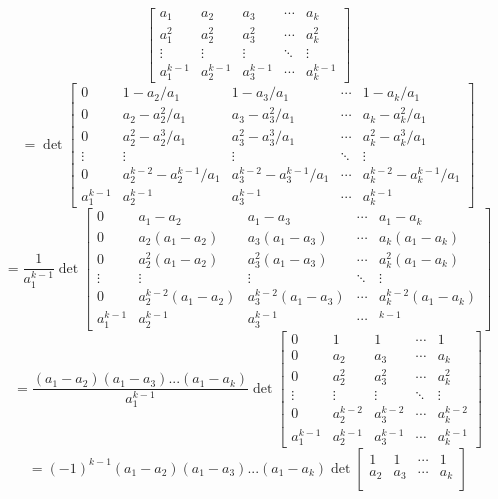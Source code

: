 \begin{itemize}
\begin{itemize}
$$\begin{bmatrix}
a_1 & a_2 & a_3 & \cdots & a_k \\
a_1^2 & a_2^2 & a_3^2 & \cdots & a_k^2 \\
\vdots & \vdots & \vdots & \ddots & \vdots \\
a_1^{k-1} & a_2^{k-1} & a_3^{k-1} & \cdots & a_k^{k-1}
\end{bmatrix}$$ 
$$= \det\begin{bmatrix}
0 & 1 - a_2/a_1 & 1 - a_3/a_1 & \cdots & 1 - a_k/a_1 \\
0 & a_2 - a_2^2/a_1 & a_3 - a_3^2/a_1 & \cdots & a_k - a_k^2/a_1 \\
0 & a_2^2 - a_2^3/a_1 & a_3^2 - a_3^3/a_1 & \cdots & a_k^2 - a_k^3/a_1 \\
\vdots & \vdots & \vdots & \ddots & \vdots \\
0 & a_2^{k-2} - a_2^{k-1}/a_1 & a_3^{k-2} - a_3^{k-1}/a_1 & \cdots & a_k^{k-2} - a_k^{k-1}/a_1 \\
a_1^{k-1} & a_2^{k-1} & a_3^{k-1} & \cdots & a_k^{k-1}
\end{bmatrix}$$
$$= \frac{1}{a_1^{k-1}}\det\begin{bmatrix}
0 & a_1 - a_2 & a_1 - a_3 & \cdots & a_1 - a_k \\
0 & a_2(a_1 - a_2) & a_3(a_1 - a_3) & \cdots & a_k(a_1 - a_k) \\
0 & a_2^2(a_1 - a_2) & a_3^2(a_1 - a_3) & \cdots & a_k^2(a_1 - a_k) \\
\vdots & \vdots & \vdots & \ddots & \vdots \\
0 & a_2^{k-2}(a_1 - a_2) & a_3^{k-2}(a_1 - a_3) & \cdots & a_k^{k-2}(a_1 - a_k) \\
a_1^{k-1} & a_2^{k-1} & a_3^{k-1} & \cdots & ^{k-1}
\end{bmatrix}$$
$$= \frac{(a_1 - a_2)(a_1 - a_3)...(a_1 - a_k)}{a_1^{k-1}}\det\begin{bmatrix}
0 & 1 & 1 & \cdots & 1 \\
0 & a_2 & a_3 & \cdots & a_k \\
0 & a_2^2 & a_3^2 & \cdots & a_k^2 \\
\vdots & \vdots & \vdots & \ddots & \vdots \\
0 & a_2^{k-2} & a_3^{k-2} & \cdots & a_k^{k-2} \\
a_1^{k-1} & a_2^{k-1} & a_3^{k-1} & \cdots & a_k^{k-1}
\end{bmatrix}$$
$$= (-1)^{k-1}(a_1 - a_2)(a_1 - a_3)...(a_1 - a_k)\det\begin{bmatrix}
1 & 1 & \cdots & 1 \\
a_2 & a_3 & \cdots & a_k \\

\end{bmatrix}$$
\end{itemize}
\end{itemize}
